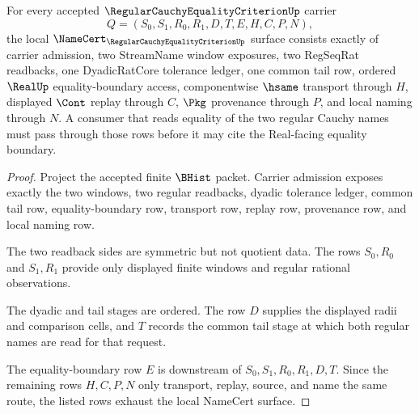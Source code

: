 \begin{theorem}
\label{thm:regular-cauchy-equality-criterion-namecert-obligations}
For every accepted $\RegularCauchyEqualityCriterionUp$ carrier
$$
Q=(S_0,S_1,R_0,R_1,D,T,E,H,C,P,N),
$$
the local $\NameCert_{\RegularCauchyEqualityCriterionUp}$ surface consists exactly of carrier admission, two StreamName window exposures, two RegSeqRat readbacks, one DyadicRatCore tolerance ledger, one common tail row, ordered $\RealUp$ equality-boundary access, componentwise $\hsame$ transport through $H$, displayed $\Cont$ replay through $C$, $\Pkg$ provenance through $P$, and local naming through $N$. A consumer that reads equality of the two regular Cauchy names must pass through those rows before it may cite the Real-facing equality boundary.
\end{theorem}
\begin{proof}
Project the accepted finite $\BHist$ packet. Carrier admission exposes exactly the two windows, two regular readbacks, dyadic tolerance ledger, common tail row, equality-boundary row, transport row, replay row, provenance row, and local naming row.

The two readback sides are symmetric but not quotient data. The rows $S_0,R_0$ and $S_1,R_1$ provide only displayed finite windows and regular rational observations.

The dyadic and tail stages are ordered. The row $D$ supplies the displayed radii and comparison cells, and $T$ records the common tail stage at which both regular names are read for that request.

The equality-boundary row $E$ is downstream of $S_0,S_1,R_0,R_1,D,T$. Since the remaining rows $H,C,P,N$ only transport, replay, source, and name the same route, the listed rows exhaust the local NameCert surface.
\end{proof}

